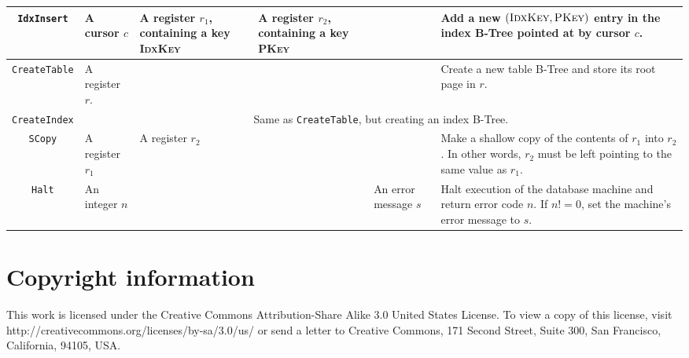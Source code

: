 \documentclass[10pt]{article}
\begin{document}
\begin{landscape}
\begin{longtable}{|c|p{3cm}|p{3cm}|p{3cm}|p{3cm}|p{4cm}|}
\texttt{IdxInsert} & 
A cursor $c$ & 
A register $r_1$, containing a key \textsc{IdxKey} &
A register $r_2$, containing a key \textsc{PKey} &
\cellcolor[gray]{0.9} &
Add a new $(\textsc{IdxKey},\textsc{PKey})$ entry in the index B-Tree pointed at by cursor $c$.\\\hline

%
%

\texttt{CreateTable} & 
A register $r$. & 
\cellcolor[gray]{0.9} &
\cellcolor[gray]{0.9} &
\cellcolor[gray]{0.9} &
Create a new table B-Tree and store its root page in $r$.\\\hline

\texttt{CreateIndex} & 
\multicolumn{5}{c|}{Same as \texttt{CreateTable}, but creating an index B-Tree.} \\\hline

%
%

\texttt{SCopy} & 
A register $r_1$ & 
A register $r_2$ &
\cellcolor[gray]{0.9} &
\cellcolor[gray]{0.9} &
Make a shallow copy of the contents of $r_1$ into $r_2$. In other words, $r_2$ must be left pointing to the same value as $r_1$.\\\hline

\texttt{Halt} & 
An integer $n$ & 
\cellcolor[gray]{0.9}&
\cellcolor[gray]{0.9} &
An error message $s$  &
Halt execution of the database machine and return error code $n$. If $n!=0$, set the machine's error message to $s$.\\\hline

\end{longtable}
\end{landscape}


\section{Copyright information}

This work is licensed under the Creative Commons Attribution-Share Alike 3.0 United States License. To view a copy of this license, visit http://creativecommons.org/licenses/by-sa/3.0/us/ or send a letter to Creative Commons, 171 Second Street, Suite 300, San Francisco, California, 94105, USA.
\end{document}
